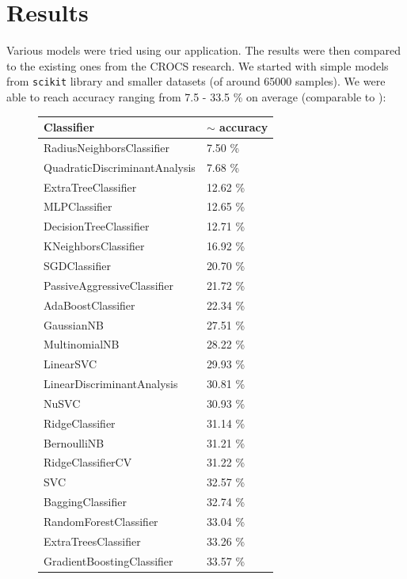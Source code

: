 \chapter{Results}
\label{chapter-results}

Various models were tried using our application. The results were then compared to the existing ones from the CROCS research. We started with simple models from \texttt{scikit} library and smaller datasets (of around 65000 samples). We were able to reach accuracy ranging from 7.5 - 33.5 \% on average (comparable to \cite{thesis_sekan}):

\begin{figure}[H]

\centering

\begin{tabular}{|l|l|}
\hline 
Classifier & $\sim$ accuracy \\
\hline 
RadiusNeighborsClassifier & 7.50 \% \\
QuadraticDiscriminantAnalysis & 7.68 \% \\
ExtraTreeClassifier & 12.62 \% \\
MLPClassifier & 12.65 \% \\
DecisionTreeClassifier & 12.71 \% \\
KNeighborsClassifier & 16.92 \% \\
SGDClassifier & 20.70 \% \\
PassiveAggressiveClassifier & 21.72 \% \\
AdaBoostClassifier & 22.34 \% \\
GaussianNB & 27.51 \% \\
MultinomialNB & 28.22 \% \\
LinearSVC & 29.93 \% \\
LinearDiscriminantAnalysis & 30.81 \% \\
NuSVC & 30.93 \% \\
RidgeClassifier & 31.14 \% \\
BernoulliNB & 31.21 \% \\
RidgeClassifierCV & 31.22 \% \\
SVC & 32.57 \% \\
BaggingClassifier & 32.74 \% \\
RandomForestClassifier & 33.04 \% \\
ExtraTreesClassifier & 33.26 \% \\
GradientBoostingClassifier & 33.57 \% \\ 
\hline
\end{tabular}

\end{figure}

